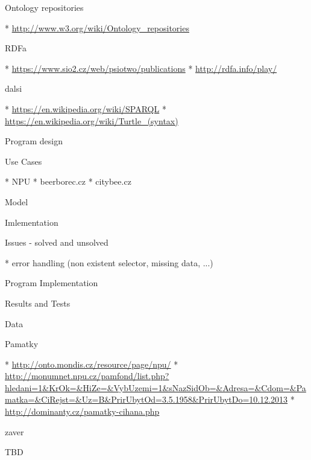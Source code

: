 \sec Ontology repositories

\begitems
 * \url{http://www.w3.org/wiki/Ontology_repositories}
\enditems


\sec RDFa

\begitems
 * \url{https://www.sio2.cz/web/psiotwo/publications}
 * \url{http://rdfa.info/play/}
\enditems


\sec dalsi

\begitems
 * \url{https://en.wikipedia.org/wiki/SPARQL}
 * \url{https://en.wikipedia.org/wiki/Turtle_(syntax)}
\enditems






\chap Program design


\sec Use Cases

\begitems
  * NPU
  * beerborec.cz
  * citybee.cz
\enditems





\sec Model




\sec Imlementation




\sec Issues - solved and unsolved

\begitems
  * error handling (non existent selector, missing data, ...)
\enditems





\chap Program Implementation








\chap Results and Tests 


\sec Data


\secc Pamatky

\begitems
  * \url{http://onto.mondis.cz/resource/page/npu/}
  * \url{http://monumnet.npu.cz/pamfond/list.php?hledani=1&KrOk=&HiZe=&VybUzemi=1&sNazSidOb=&Adresa=&Cdom=&Pamatka=&CiRejst=&Uz=B&PrirUbytOd=3.5.1958&PrirUbytDo=10.12.2013}
  * \url{http://dominanty.cz/pamatky-cihana.php}
\enditems





\chap zaver

TBD


\bye
